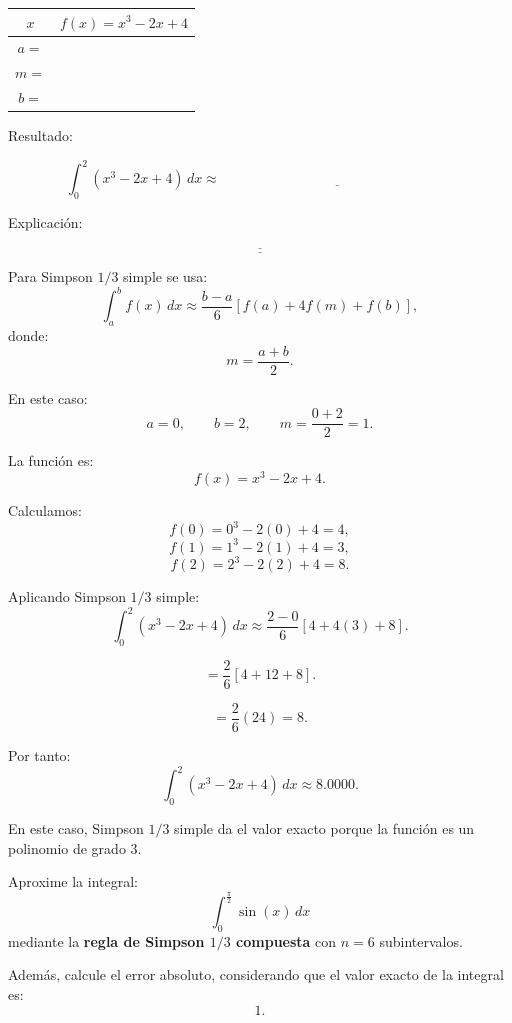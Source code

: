 \documentclass[11pt,respuestas,a4]{aleph-examen}
\begin{document}
\begin{preguntas}
\begin{center}
\renewcommand{\arraystretch}{1.4}
\begin{tabular}{c|c}
\toprule
$x$ & $f(x)=x^3-2x+4$ \\
\midrule
$a=$ &  \\
$m=$ &  \\
$b=$ &  \\
\bottomrule
\end{tabular}
\end{center}

Resultado:

\[
\int_0^2 (x^3-2x+4)\,dx
\approx
\underline{\hspace{7cm}}
\]

Explicación:

\[
\underline{\hspace{14cm}}
\]
\[
\underline{\hspace{14cm}}
\]

\begin{respuesta}
Para Simpson $1/3$ simple se usa:
\[
\int_a^b f(x)\,dx
\approx
\frac{b-a}{6}
\left[
f(a)+4f(m)+f(b)
\right],
\]
donde:
\[
m=\frac{a+b}{2}.
\]

En este caso:
\[
a=0,
\qquad
b=2,
\qquad
m=\frac{0+2}{2}=1.
\]

La función es:
\[
f(x)=x^3-2x+4.
\]

Calculamos:
\[
f(0)=0^3-2(0)+4=4,
\]
\[
f(1)=1^3-2(1)+4=3,
\]
\[
f(2)=2^3-2(2)+4=8.
\]

Aplicando Simpson $1/3$ simple:
\[
\int_0^2 (x^3-2x+4)\,dx
\approx
\frac{2-0}{6}
\left[
4+4(3)+8
\right].
\]

\[
=
\frac{2}{6}
\left[
4+12+8
\right].
\]

\[
=
\frac{2}{6}(24)=8.
\]

Por tanto:
\[
\boxed{\int_0^2 (x^3-2x+4)\,dx\approx 8.0000}.
\]

En este caso, Simpson $1/3$ simple da el valor exacto porque la función es un polinomio de grado $3$.
\end{respuesta}


\item
Aproxime la integral: 
\[
\int_0^{\frac{\pi}{2}} \sin(x)\,dx
\]
mediante la \textbf{regla de Simpson $1/3$ compuesta} con $n=6$ subintervalos.

Además, calcule el error absoluto, considerando que el valor exacto de la integral es:
\[
1.
\]


\end{preguntas}
\end{document}
